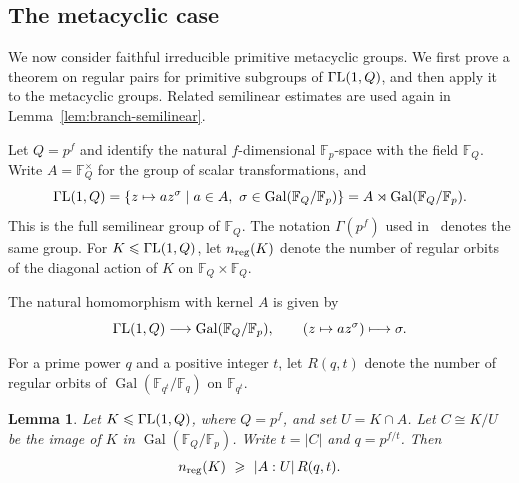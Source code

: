 \documentclass[10pt]{amsart}
\newtheorem{lemma}[theorem]{Lemma}
\theoremstyle{definition}
\renewcommand{\ge}{\geqslant}
\renewcommand{\leq}{\leqslant}
\newcommand{\GammaL}{\Gamma{\rm L}}
\DeclareMathOperator{\Gal}{Gal}
\numberwithin{equation}{section}
\numberwithin{table}{section}
\begin{document}
\subsection{The metacyclic case}
\label{sec:semilinear}

We now consider faithful irreducible primitive metacyclic groups. We
first prove a theorem on regular pairs for primitive subgroups of
$\GammaL(1,Q)$, and then apply it to the metacyclic groups. Related
semilinear estimates are used again in Lemma~\ref{lem:branch-semilinear}.

Let $Q=p^{f}$ and identify the natural $f$-dimensional $\mathbb{F}_p$-space with the
field $\mathbb{F}_Q$. Write $A=\mathbb{F}_Q^{\times}$ for the group of scalar
transformations, and
$$
  \GammaL(1,Q)
  =\{z\mapsto az^\sigma\mid a\in A,\ 
      \sigma\in\Gal(\mathbb{F}_Q/\mathbb{F}_p)\}
  =A\rtimes\Gal(\mathbb{F}_Q/\mathbb{F}_p).
$$
This is the full semilinear group
of $\mathbb{F}_Q$. The notation $\Gamma(p^f)$ used in~\cite{HY23,Yang10,Yang11b,YangVV22} denotes the same group. For $K\leq\GammaL(1,Q)$, let $n_{\rm reg}(K)$ denote the
number of regular orbits of the diagonal action of $K$ on
$\mathbb{F}_Q\times\mathbb{F}_Q$.

The natural homomorphism with kernel $A$ is given by
$$
  \GammaL(1,Q)\longrightarrow\Gal(\mathbb{F}_Q/\mathbb{F}_p),
  \qquad (z\mapsto az^\sigma)\longmapsto\sigma.
$$

For a prime power $q$ and a positive integer $t$, let $R(q,t)$ denote the
number of regular orbits of $\Gal(\mathbb{F}_{q^t}/\mathbb{F}_q)$ on
$\mathbb{F}_{q^t}$.

\begin{lemma}\label{lem:semilinear-count}
Let $K\leq\GammaL(1,Q)$, where $Q=p^f$, and set $U=K\cap A$.
Let $C\cong K/U$ be the image of $K$ in
$\Gal(\mathbb{F}_Q/\mathbb{F}_p)$. Write $t=|C|$ and $q=p^{f/t}$. Then
$$
  n_{\rm reg}(K)\ \ge\ |A:U|\,R(q,t).
$$
\end{lemma}
\end{document}
